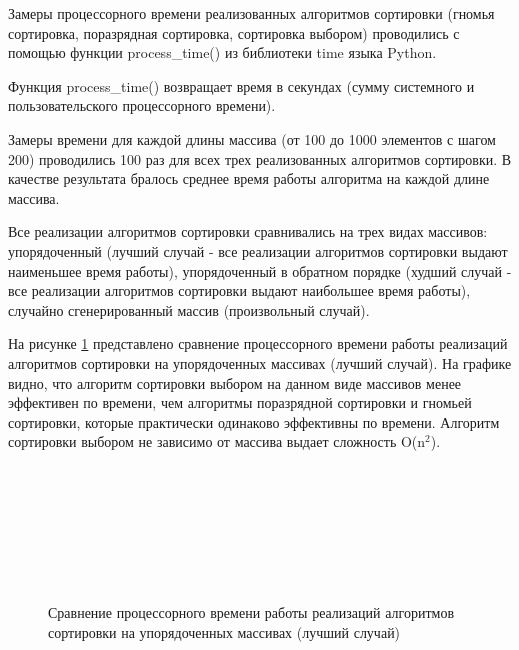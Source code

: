 Замеры процессорного времени реализованных алгоритмов сортировки (гномья сортировка, поразрядная сортировка, сортировка выбором) проводились с помощью функции process\_time() из библиотеки time языка Python. 

Функция process\_time() возвращает время в секундах (сумму системного и пользовательского процессорного времени).

Замеры времени для каждой длины массива (от 100 до 1000 элементов с шагом 200) проводились 100 раз для всех трех реализованных алгоритмов сортировки. В качестве результата бралось среднее время работы алгоритма на каждой длине массива.

Все реализации алгоритмов сортировки сравнивались на трех видах массивов: упорядоченный (лучший случай - все реализации алгоритмов сортировки выдают наименьшее время работы), упорядоченный в обратном порядке (худший случай - все реализации алгоритмов сортировки выдают наибольшее время работы), случайно сгенерированный массив (произвольный случай).

На рисунке \ref{fig:fig1} представлено сравнение процессорного времени работы реализаций алгоритмов сортировки на упорядоченных массивах (лучший случай).
На графике видно, что алгоритм сортировки выбором на данном виде массивов менее эффективен по времени, чем алгоритмы поразрядной сортировки и гномьей сортировки, которые практически одинаково эффективны по времени. Алгоритм сортировки выбором не зависимо от массива выдает сложность O(n$^2$).
\\
\\
\\
\\
\\
\\
\\
\\

\begin{figure}[h!]
	
	
	\caption{Сравнение процессорного времени работы реализаций алгоритмов сортировки на упорядоченных массивах (лучший случай)}
	
	\label{fig:fig1}
	
\end{figure}

